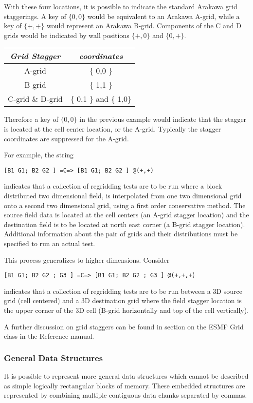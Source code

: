 With these four locations, it is possible to indicate the standard Arakawa grid staggerings. A key of $\{ 0,0 \}$ would be equivalent to an Arakawa A-grid, while a key of $\{ +,+ \}$ would represent an Arakawa B-grid. Components of the C and D grids would be indicated by wall positions $\{ +,0 \}$ and $\{ 0,+ \}$.
\begin{center}
\begin{tabular}{| c | c |} \hline 
{\em Grid Stagger } & {\em coordinates} \\
\hline \hline
  A-grid & \{ 0,0 \}  \\
  B-grid & \{ 1,1 \}  \\
  C-grid \& D-grid & \{ 0,1 \} and \{ 1,0\} \\
\hline 
\end{tabular}
\end{center}
Therefore a key of $\{ 0,0 \}$ in the previous example would indicate that the stagger is located at the cell center location, or the A-grid. Typically the stagger coordinates are suppressed for the A-grid. 

For example, the string
\begin{verbatim}
[B1 G1; B2 G2 ] =C=> [B1 G1; B2 G2 ] @(+,+)
\end{verbatim}
indicates that a collection of regridding tests are to be run where a block distributed two dimensional field, is interpolated from one two dimensional grid onto a second two dimensional grid, using a first order conservative method. The source field data is located at the cell centers (an A-grid stagger location) and the destination field is to be located at north east corner (a B-grid stagger location). Additional information about the pair of grids and their distributions must be specified to run an actual test. 

This process generalizes to higher dimensions. Consider 
\begin{verbatim}
[B1 G1; B2 G2 ; G3 ] =C=> [B1 G1; B2 G2 ; G3 ] @(+,+,+)
\end{verbatim}
indicates that a collection of regridding tests are to be run between a 3D source grid (cell centered) and a 3D destination grid where the field stagger location is the upper corner of the 3D cell (B-grid horizontally and top of the cell vertically).

A further discussion on grid staggers can be found in section on the ESMF Grid class in the Reference manual.  

\subsubsection{General Data Structures}
It is possible to represent more general data structures which cannot be described as simple logically rectangular blocks of memory. These embedded structures are represented by combining multiple contiguous data chunks separated by commas. 

